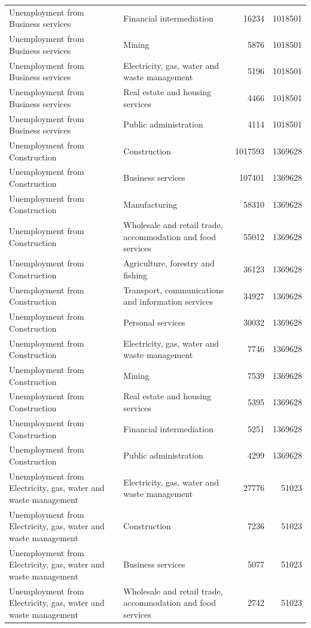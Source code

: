 \begin{longtable}{llrr}
Unemployment from Business services & Financial intermediation & 16234 & 1018501 \\
Unemployment from Business services & Mining & 5876 & 1018501 \\
Unemployment from Business services & Electricity, gas, water and waste management & 5196 & 1018501 \\
Unemployment from Business services & Real estate and housing services & 4466 & 1018501 \\
Unemployment from Business services & Public administration & 4114 & 1018501 \\
Unemployment from Construction & Construction & 1017593 & 1369628 \\
Unemployment from Construction & Business services & 107401 & 1369628 \\
Unemployment from Construction & Manufacturing & 58310 & 1369628 \\
Unemployment from Construction & Wholesale and retail trade, accommodation and food services & 55012 & 1369628 \\
Unemployment from Construction & Agriculture, forestry and fishing & 36123 & 1369628 \\
Unemployment from Construction & Transport, communications and information services & 34927 & 1369628 \\
Unemployment from Construction & Personal services & 30032 & 1369628 \\
Unemployment from Construction & Electricity, gas, water and waste management & 7746 & 1369628 \\
Unemployment from Construction & Mining & 7539 & 1369628 \\
Unemployment from Construction & Real estate and housing services & 5395 & 1369628 \\
Unemployment from Construction & Financial intermediation & 5251 & 1369628 \\
Unemployment from Construction & Public administration & 4299 & 1369628 \\
Unemployment from Electricity, gas, water and waste management & Electricity, gas, water and waste management & 27776 & 51023 \\
Unemployment from Electricity, gas, water and waste management & Construction & 7236 & 51023 \\
Unemployment from Electricity, gas, water and waste management & Business services & 5077 & 51023 \\
Unemployment from Electricity, gas, water and waste management & Wholesale and retail trade, accommodation and food services & 2742 & 51023 \\

\end{longtable}
